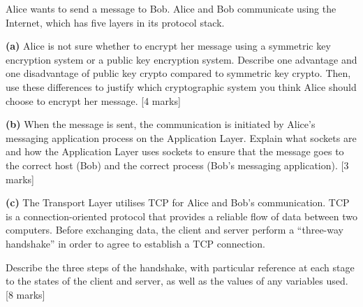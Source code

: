 Alice wants to send a message to Bob. Alice and Bob communicate using the Internet, which has five layers in its protocol stack.

\textbf{(a)}
Alice is not sure whether to encrypt her message using a symmetric key encryption system or a public key encryption system. Describe one advantage and one disadvantage of public key crypto compared to symmetric key crypto. Then, use these differences to justify which cryptographic system you think Alice should choose to encrypt her message. \hfill [4 marks]

\textbf{(b)}
When the message is sent, the communication is initiated by Alice’s messaging application process on the Application Layer. Explain what sockets are and how the Application Layer uses sockets to ensure that the message goes to the correct host (Bob) and the correct process (Bob’s messaging application). \hfill [3 marks]

\textbf{(c)}
The Transport Layer utilises TCP for Alice and Bob’s communication. TCP is a connection-oriented protocol that provides a reliable flow of data between two computers. Before exchanging data, the client and server perform a “three-way handshake” in order to agree to establish a TCP connection.

Describe the three steps of the handshake, with particular reference at each stage to the states of the client and server, as well as the values of any variables used. \hfill [8 marks]

